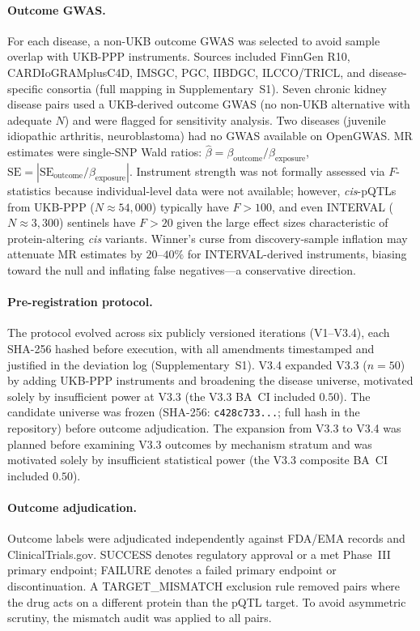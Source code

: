 \documentclass[11pt]{article}
\begin{document}
\paragraph{Outcome GWAS.}
For each disease, a non-UKB outcome GWAS was selected to avoid sample overlap with UKB-PPP instruments. Sources included FinnGen R10, CARDIoGRAMplusC4D, IMSGC, PGC, IIBDGC, ILCCO/TRICL, and disease-specific consortia (full mapping in Supplementary~S1). Seven chronic kidney disease pairs used a UKB-derived outcome GWAS (no non-UKB alternative with adequate $N$) and were flagged for sensitivity analysis. Two diseases (juvenile idiopathic arthritis, neuroblastoma) had no GWAS available on OpenGWAS. MR estimates were single-SNP Wald ratios: $\hat{\beta} = \beta_{\text{outcome}} / \beta_{\text{exposure}}$, $\text{SE} = |\text{SE}_{\text{outcome}} / \beta_{\text{exposure}}|$. Instrument strength was not formally assessed via $F$-statistics because individual-level data were not available; however, \emph{cis}-pQTLs from UKB-PPP ($N \approx 54{,}000$) typically have $F > 100$, and even INTERVAL ($N \approx 3{,}300$) sentinels have $F > 20$ given the large effect sizes characteristic of protein-altering \emph{cis} variants. Winner's curse from discovery-sample inflation \citep{burgess2011weak} may attenuate MR estimates by $20$--$40\%$ for INTERVAL-derived instruments, biasing toward the null and inflating false negatives---a conservative direction.

\paragraph{Pre-registration protocol.}
The protocol evolved across six publicly versioned iterations (V1--V3.4), each SHA-256 hashed before execution, with all amendments timestamped and justified in the deviation log (Supplementary~S1). V3.4 expanded V3.3 ($n = 50$) by adding UKB-PPP instruments and broadening the disease universe, motivated solely by insufficient power at V3.3 (the V3.3 BA~CI included $0.50$). The candidate universe was frozen (SHA-256: \texttt{c428c733...}; full hash in the repository) before outcome adjudication. The expansion from V3.3 to V3.4 was planned before examining V3.3 outcomes by mechanism stratum and was motivated solely by insufficient statistical power (the V3.3 composite BA~CI included $0.50$).

\paragraph{Outcome adjudication.}
Outcome labels were adjudicated independently against FDA/EMA records and ClinicalTrials.gov. SUCCESS denotes regulatory approval or a met Phase~III primary endpoint; FAILURE denotes a failed primary endpoint or discontinuation. A TARGET\_MISMATCH exclusion rule removed pairs where the drug acts on a different protein than the pQTL target. To avoid asymmetric scrutiny, the mismatch audit was applied to all pairs.
\end{document}
